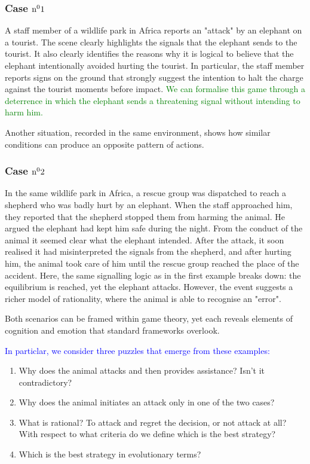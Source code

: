 \subsubsection*{Case \(\text{n}^{{\small{0}}}1\)} \label{sub:case1}
A staff member of a wildlife park in Africa reports an "attack" by an elephant on a tourist. The scene clearly highlights the signals that the elephant sends to the tourist. It also clearly identifies the reasons why it is logical to believe that the elephant intentionally avoided hurting the tourist.
In particular, the staff member reports signs on the ground that strongly suggest the intention to halt the charge against the tourist moments before impact.
\textcolor{green}{We can formalise this game through a deterrence in which the elephant sends a threatening signal without intending to harm him.}

\vspace{1em}
Another situation, recorded in the same environment, shows how similar conditions can produce an opposite pattern of actions.

\subsubsection*{Case \(\text{n}^{{\small{0}}}2\)} \label{sub:case2}
In the same wildlife park in Africa, a rescue group was dispatched to reach a shepherd who was badly hurt by an elephant. When the staff approached him, they reported that the shepherd stopped them from harming the animal. He argued the elephant had kept him safe during the night. From the conduct of the animal it seemed clear what the elephant intended. After the attack, it soon realised it had misinterpreted the signals from the shepherd, and after hurting him, the animal took care of him until the rescue group reached the place of the accident.
Here, the same signalling logic as in the first example breaks down: the equilibrium is reached, yet the elephant attacks. However, the event suggests a richer model of rationality, where the animal is able to recognise an "error".
\vspace{1em}

Both scenarios can be framed within game theory, yet each reveals elements of cognition and emotion that standard frameworks overlook.

\textcolor{blue}{In particlar, we consider three puzzles that emerge from these examples:}

\begin{enumerate}
  \item Why does the animal attacks and then provides assistance? Isn't it contradictory?
  \item Why does the animal initiates an attack only in one of the two cases?
  \item What is rational? To attack and regret the decision, or not attack at all? With respect to what criteria do we define which is the best strategy?
  \item Which is the best strategy in evolutionary terms?
\end{enumerate}

